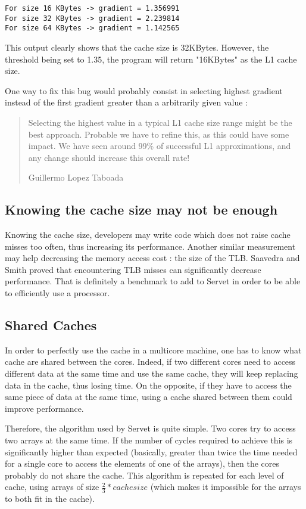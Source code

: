 \lstset{caption=A part of the output of $./job.sh est_cache$ on a Nehalem E5504}
\begin{lstlisting}
For size 16 KBytes -> gradient = 1.356991 
For size 32 KBytes -> gradient = 2.239814 
For size 64 KBytes -> gradient = 1.142565 
\end{lstlisting}

This output clearly shows that the cache size is 32KBytes. However, the
threshold being set to 1.35, the program will return "16KBytes" as the L1 cache
size.

One way to fix this bug would probably consist in selecting highest gradient
instead of the first gradient greater than a arbitrarily given value :

\begin{quotation}
Selecting the highest value in a typical L1 cache size range might be the best
approach. Probable we have to refine this, as this could have some impact. We
have seen around 99\% of successful L1 approximations, and any change should
increase this overall rate! 
\begin{flushright}Guillermo Lopez Taboada\end{flushright}
\end{quotation}

\subsection{Knowing the cache size may not be enough}
Knowing the cache size, developers may write code which does not raise cache
misses too often, thus increasing its performance. Another similar measurement
may help decreasing the memory access cost : the size of the TLB. Saavedra and
Smith\cite{Cache_TLB} proved that encountering TLB misses can significantly
decrease performance. That is definitely a benchmark to add to Servet in order
to be able to efficiently use a processor.

\subsection{Shared Caches}
In order to perfectly use the cache in a multicore machine, one has to know what
cache are shared between the cores. Indeed, if two different cores need to
access different data at the same time and use the same cache, they will keep
replacing data in the cache, thus losing time. On the opposite, if they have to
access the same piece of data at the same time, using a cache shared between
them could improve performance.

Therefore, the algorithm used by Servet is quite simple. Two cores try to
access two arrays at the same time. If the number of cycles required to achieve
this is significantly higher than expected (basically, greater than twice the
time needed for a single core to access the elements of one of the arrays), then
the cores probably do not share the cache. This algorithm is repeated for each
level of cache, using arrays of size $\frac{2}{3} * cache size$ (which makes it
impossible for the arrays to both fit in the cache).
